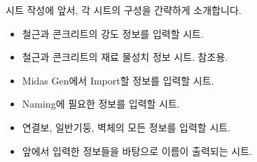 \documentclass[a4paper,11pt,korean,openany,oneside]{sphinxmanual}
\begin{document}
\sphinxAtStartPar
시트 작성에 앞서, 각 시트의 구성을 간략하게 소개합니다.
\begin{itemize}
\item {} \begin{description}
\sphinxAtStartPar
철근과 콘크리트의 강도 정보를 입력할 시트.

\end{description}

\item {} \begin{description}
\sphinxAtStartPar
철근과 콘크리트의 재료 물성치 정보 시트. 참조용.

\end{description}

\item {} \begin{description}
\sphinxAtStartPar
Midas Gen에서 Import할 정보를 입력할 시트.

\end{description}

\item {} \begin{description}
\sphinxAtStartPar
Naming에 필요한 정보를 입력할 시트.

\end{description}

\item {} \begin{description}
\sphinxAtStartPar
연결보, 일반기둥, 벽체의 모든 정보를 입력할 시트.

\end{description}

\item {} \begin{description}
\sphinxAtStartPar
앞에서 입력한 정보들을 바탕으로 이름이 출력되는 시트.


\end{description}
\end{itemize}
\end{document}
